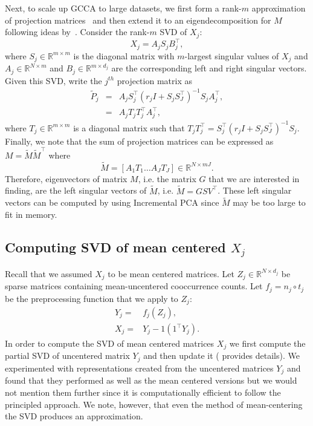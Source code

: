 \documentclass[11pt]{article}
\newcommand{\R}{\mathbb{R}}
\begin{document}
Next, to scale up GCCA to large datasets, we first form a rank-$m$ approximation of projection matrices~\cite{arora2012kernel} and then extend it to an eigendecomposition for $M$ following ideas by~. Consider the rank-$m$ SVD of $X_j$:
$$X_j = A_{j} S_{j} B^\top_{j},$$
where $S_j \in \R^{m \times m}$ is the diagonal matrix with $m$-largest singular values of $X_j$ and $A_j \in \R^{N \times m}$ and $B_j \in \R^{m \times d_j}$ are the corresponding left and right singular vectors. Given this SVD, write the $j^{th}$ projection matrix as
\begin{eqnarray}
\widetilde{P}_j &=& A_j S_j^\top(r_j I + S_j S_J^\top)^{-1}S_j A_j^\top, \nonumber \\
&=& A_j T_j T_j^\top A_j^\top, \nonumber
\end{eqnarray}
where $T_j \in \mathbb{R}^{m \times m}$ is a diagonal matrix such that
$T_jT_j^\top = S_j^\top(r_j I + S_j S_J^\top)^{-1}S_j$. Finally, we note that the sum of projection matrices can be expressed as $M = \tilde{M} \tilde{M}^\top$
where $$\tilde{M} = \left[ A_1T_1 \ldots A_JT_J \right] \in \mathbb{R}^{N
  \times mJ}.$$
Therefore, eigenvectors of matrix $M$, i.e. the matrix $G$ that we are interested in finding, are the left singular vectors of $\tilde{M}$, i.e. $\tilde{M}=GSV^\top$. These left singular vectors can be computed by using Incremental PCA \cite{brand2002incremental} since $\tilde{M}$ may be too large to fit in memory.

\subsection{Computing SVD of mean centered $X_j$}
\label{ssec:svdmc}
Recall that we assumed $X_j$ to be mean centered matrices. Let $Z_j
\in \mathbb{R}^{N \times d_j}$ be sparse matrices containing
mean-uncentered cooccurrence counts. Let $f_j = n_j \circ t_j $ be the preprocessing
function that we apply to $Z_j$:
\begin{align}
  Y_j =& f_j (Z_j), \\
  X_j =& Y_j - 1 (1^\top Y_j).
\end{align}
In order to compute the SVD of mean centered matrices $X_j$ we first
compute the partial SVD of uncentered
matrix $Y_j$ and then update it ( provides details).
We experimented with representations created from the
uncentered matrices $Y_j$ and found that they performed as well as
the mean centered versions but we would not mention them further since
it is computationally efficient to follow the principled approach. We
note, however, that even the method of mean-centering the SVD
produces an approximation.
\end{document}
